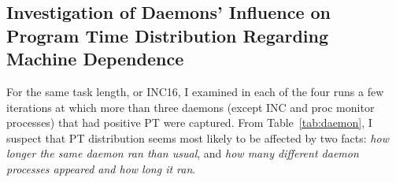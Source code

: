 \newpage
\clearpage

\subsection{Investigation of Daemons' Influence on Program Time Distribution Regarding Machine Dependence~\label{sec:daemon_impact}} 

For the same task length, or INC16, 
I examined in each of the four runs a few iterations at which more than three daemons (except INC and proc monitor processes) that had positive PT were captured.  
From Table~\ref{tab:daemon}, I suspect that PT distribution seems most likely to be affected by two facts: {\it how longer the same daemon ran than usual}, and {\it how many different daemon processes appeared and how long it ran}.

